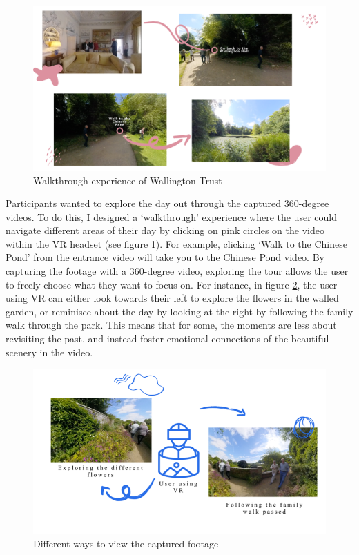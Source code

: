 \begin{figure}[htp]
\centering
\includegraphics[width=.8\linewidth]{Images/ChapterFour/WalktrhoughOfWallington.png}
\caption{Walkthrough experience of Wallington Trust}
\label{fig:wallingtonTrust}
\end{figure}

Participants wanted to explore the day out through the captured 360-degree videos. To do this, I designed a ‘walkthrough’ experience where the user could navigate different areas of their day by clicking on pink circles on the video within the VR headset (see figure \ref{fig:wallingtonTrust}). For example, clicking ‘Walk to the Chinese Pond’ from the entrance video will take you to the Chinese Pond video. By capturing the footage with a 360-degree video, exploring the tour allows the user to freely choose what they want to focus on. For instance, in figure \ref{fig:capturedFootage}, the user using VR can either look towards their left to explore the flowers in the walled garden, or reminisce about the day by looking at the right by following the family walk through the park. This means that for some, the moments are less about revisiting the past, and instead foster emotional connections of the beautiful scenery in the video. 

\begin{figure}[htp]
\centering
\includegraphics[width=.8\linewidth]{Images/ChapterFour/WaysToViewCapturedFootage.png}
\caption{Different ways to view the captured footage}
\label{fig:capturedFootage}
\end{figure}

